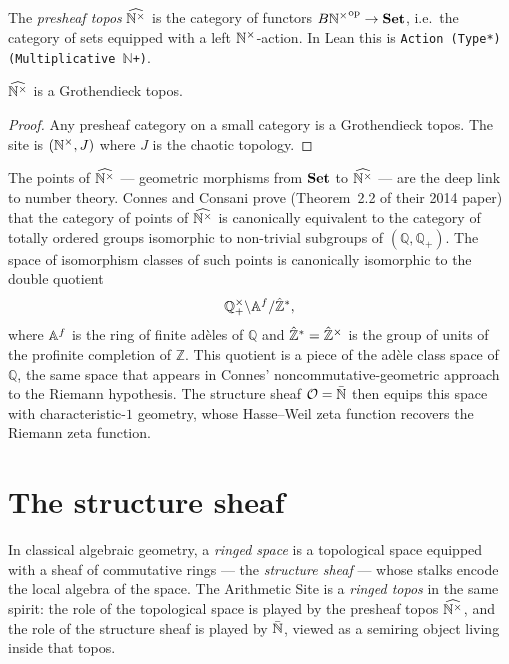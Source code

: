 \begin{definition}[label=def:presheaf_topos, uses=def:BNplus]
  \label{def:presheaf_topos}\leanok
  The \emph{presheaf topos} $\widehat{\mathbb{N}^{\times}}$ is the category of functors
  $B{\mathbb{N}^{\times}}^{\mathrm{op}} \to \mathbf{Set}$, i.e.\ the category of sets
  equipped with a left $\mathbb{N}^{\times}$-action. In Lean this is
  \texttt{Action (Type*) (Multiplicative $\mathbb{N}$+)}.
\end{definition}

\begin{lemma}[label=lem:presheaf_topos_is_topos, uses=def:presheaf_topos]
  \label{lem:presheaf_topos_is_topos}
  $\widehat{\mathbb{N}^{\times}}$ is a Grothendieck topos.
\end{lemma}
\begin{proof}
  Any presheaf category on a small category is a Grothendieck topos.
  The site is $(\mathbb{N}^{\times}, J)$ where $J$ is the chaotic topology.
\end{proof}

\begin{remark}
  The points of $\widehat{\mathbb{N}^{\times}}$ --- geometric morphisms from $\mathbf{Set}$
  to $\widehat{\mathbb{N}^{\times}}$ --- are the deep link to number theory.  Connes and
  Consani prove (Theorem~2.2 of their 2014 paper) that the category of points
  of $\widehat{\mathbb{N}^{\times}}$ is canonically equivalent to the category of totally
  ordered groups isomorphic to non-trivial subgroups of
  $(\mathbb{Q}, \mathbb{Q}_+)$.  The space of isomorphism classes of
  such points is canonically isomorphic to the double quotient
  \[
    \mathbb{Q}^{\times}_{+} \backslash \mathbb{A}^{f} / \hat{\mathbb{Z}}^*,
  \]
  where $\mathbb{A}^{f}$ is the ring of finite ad\`eles of $\mathbb{Q}$ and
  $\hat{\mathbb{Z}}^* = \hat{\mathbb{Z}}^\times$ is the group of units of the
  profinite completion of $\mathbb{Z}$.  This quotient is a piece of the
  ad\`ele class space of $\mathbb{Q}$, the same space that appears in
  Connes' noncommutative-geometric approach to the Riemann
  hypothesis.  The structure sheaf $\mathcal{O} = \bar{\mathbb{N}}$ then equips
  this space with characteristic-$1$ geometry, whose Hasse--Weil zeta
  function recovers the Riemann zeta function.
\end{remark}

\chapter{The structure sheaf}

In classical algebraic geometry, a \emph{ringed space} is a topological
space equipped with a sheaf of commutative rings --- the \emph{structure
sheaf} --- whose stalks encode the local algebra of the space.  The
Arithmetic Site is a \emph{ringed topos} in the same spirit: the role of
the topological space is played by the presheaf topos $\widehat{\mathbb{N}^{\times}}$,
and the role of the structure sheaf is played by $\bar{\mathbb{N}}$, viewed as a
semiring object living inside that topos.

